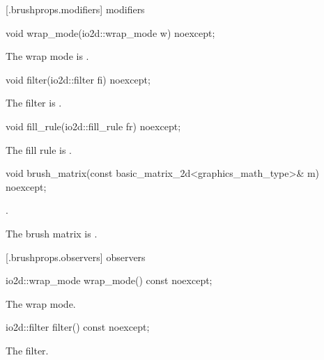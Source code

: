  [\iotwod.brushprops.modifiers] { modifiers}

%
\begin{itemdecl}
void wrap_mode(io2d::wrap_mode w) noexcept;
\end{itemdecl}
\begin{itemdescr}
\pnum
\effects
The wrap mode is .
\end{itemdescr}

%
\begin{itemdecl}
void filter(io2d::filter fi) noexcept;
\end{itemdecl}
\begin{itemdescr}
\pnum
\effects
The filter is .
\end{itemdescr}

%
\begin{itemdecl}
void fill_rule(io2d::fill_rule fr) noexcept;
\end{itemdecl}
\begin{itemdescr}
\pnum
\effects
The fill rule is .
\end{itemdescr}

%
\begin{itemdecl}
void brush_matrix(const basic_matrix_2d<graphics_math_type>& m) noexcept;
\end{itemdecl}
\begin{itemdescr}
\pnum
\requires
{}.

\pnum
\effects
The brush matrix is .
\end{itemdescr}

 [\iotwod.brushprops.observers] { observers}

%
\begin{itemdecl}
io2d::wrap_mode wrap_mode() const noexcept;
\end{itemdecl}
\begin{itemdescr}
\pnum
\returns
The wrap mode.
\end{itemdescr}

%
\begin{itemdecl}
io2d::filter filter() const noexcept;
\end{itemdecl}
\begin{itemdescr}
\pnum
\returns
The filter.
\end{itemdescr}

